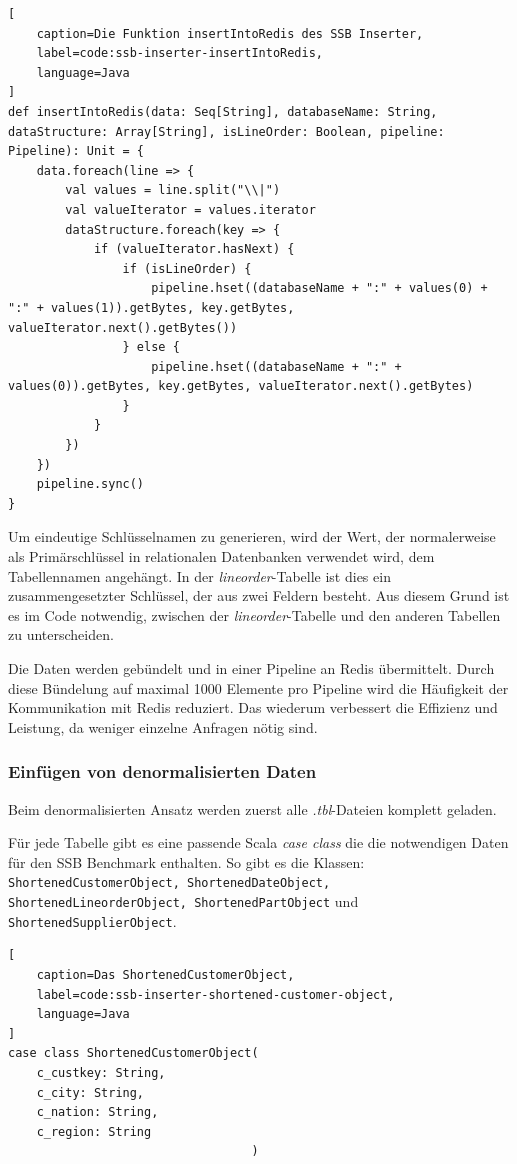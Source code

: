 \begin{lstlisting}[
    caption=Die Funktion insertIntoRedis des SSB Inserter,
    label=code:ssb-inserter-insertIntoRedis,
    language=Java
]
def insertIntoRedis(data: Seq[String], databaseName: String, dataStructure: Array[String], isLineOrder: Boolean, pipeline: Pipeline): Unit = {
	data.foreach(line => {
		val values = line.split("\\|")
		val valueIterator = values.iterator
		dataStructure.foreach(key => {
			if (valueIterator.hasNext) {
				if (isLineOrder) {
					pipeline.hset((databaseName + ":" + values(0) + ":" + values(1)).getBytes, key.getBytes, valueIterator.next().getBytes())
				} else {
					pipeline.hset((databaseName + ":" + values(0)).getBytes, key.getBytes, valueIterator.next().getBytes)
				}
			}
		})
	})
	pipeline.sync()
}
\end{lstlisting}

Um eindeutige Schlüsselnamen zu generieren, wird der Wert, der normalerweise als Primärschlüssel in relationalen Datenbanken verwendet wird, dem Tabellennamen angehängt. In der \emph{lineorder}-Tabelle ist dies ein zusammengesetzter Schlüssel, der aus zwei Feldern besteht. Aus diesem Grund ist es im Code notwendig, zwischen der \emph{lineorder}-Tabelle und den anderen Tabellen zu unterscheiden.

Die Daten werden gebündelt und in einer Pipeline an Redis übermittelt. Durch diese Bündelung auf maximal 1000 Elemente pro Pipeline wird die Häufigkeit der Kommunikation mit Redis reduziert. Das wiederum verbessert die Effizienz und Leistung, da weniger einzelne Anfragen nötig sind.


\subsubsection{Einfügen von denormalisierten Daten}
Beim denormalisierten Ansatz werden zuerst alle \emph{.tbl}-Dateien komplett geladen.

Für jede Tabelle gibt es eine passende Scala \emph{case class} die die notwendigen Daten für den SSB Benchmark enthalten. So gibt es die Klassen: \lstinline|ShortenedCustomerObject, ShortenedDateObject, ShortenedLineorderObject, ShortenedPartObject| und \lstinline|ShortenedSupplierObject|.

\begin{lstlisting}[
    caption=Das ShortenedCustomerObject,
    label=code:ssb-inserter-shortened-customer-object,
    language=Java
]
case class ShortenedCustomerObject(
	c_custkey: String,
	c_city: String,
	c_nation: String,
	c_region: String
								  )
\end{lstlisting}


